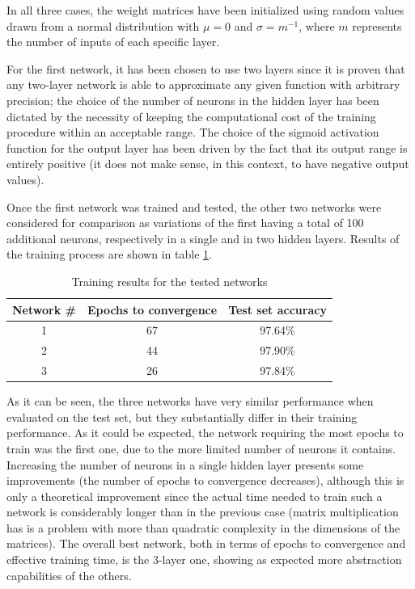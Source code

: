 \documentclass[letterpaper,headings=standardclasses]{scrartcl}
\begin{document}
In all three cases, the weight matrices have been initialized using random values drawn from a normal distribution with $\mu = 0$ and $\sigma = m^{-1}$, where $m$ represents the number of inputs of each specific layer.

For the first network, it has been chosen to use two layers since it is proven that any two-layer network is able to approximate any given function with arbitrary precision; the choice of the number of neurons in the hidden layer has been dictated by the necessity of keeping the computational cost of the training procedure within an acceptable range. The choice of the sigmoid activation function for the output layer has been driven by the fact that its output range is entirely positive (it does not make sense, in this context, to have negative output values).

Once the first network was trained and tested, the other two networks were considered for comparison as variations of the first having a total of 100 additional neurons, respectively in a single and in two hidden layers. Results of the training process are shown in table \ref{net_results}.

\begin{table}[h]
    \centering
    \begin{tabular}{|c|c|c|}
    \hline
    Network \# & Epochs to convergence & Test set accuracy \\ \hline
    1 & 67 & 97.64\% \\ \hline
    2 & 44 & 97.90\% \\ \hline
    3 & 26 & 97.84\% \\ \hline
    \end{tabular}
    \caption{Training results for the tested networks}
    \label{net_results}
\end{table}

As it can be seen, the three networks have very similar performance when evaluated on the test set, but they substantially differ in their training performance. As it could be expected, the network requiring the most epochs to train was the first one, due to the more limited number of neurons it contains. Increasing the number of neurons in a single hidden layer presents some improvements (the number of epochs to convergence decreases), although this is only a theoretical improvement since the actual time needed to train such a network is considerably longer than in the previous case (matrix multiplication has is a problem with more than quadratic complexity in the dimensions of the matrices). The overall best network, both in terms of epochs to convergence and effective training time, is the 3-layer one, showing as expected more abstraction capabilities of the others.
\end{document}
